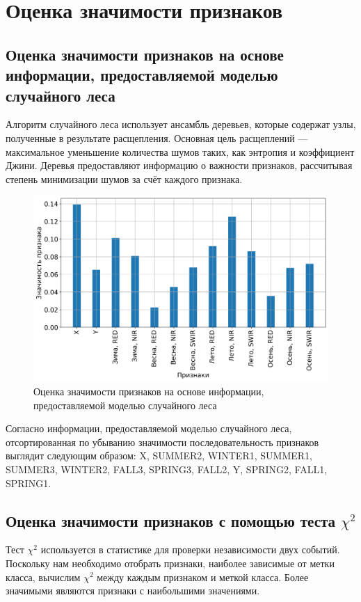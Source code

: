 \documentclass[14pt, a4paper, oneside]{extarticle}
\begin{document}
\section{Оценка значимости признаков}
\subsection{Оценка значимости признаков на основе информации, предоставляемой моделью случайного леса}
Алгоритм случайного леса использует ансамбль деревьев, которые содержат узлы, полученные в результате расщепления. Основная цель расщеплений --- максимальное уменьшение количества шумов таких, как энтропия и коэффициент Джини. Деревья предоставляют информацию о важности признаков, рассчитывая степень минимизации шумов за счёт каждого признака.

\begin{figure}[H]
    \caption{Оценка значимости признаков на основе информации, предоставляемой моделью случайного леса}
    \centering
    \includegraphics[scale=0.6]{rf-feature-importances}
\end{figure}

Согласно информации, предоставляемой моделью случайного леса, отсортированная по убыванию значимости последовательность признаков выглядит следующим образом: X, SUMMER2, WINTER1, SUMMER1, SUMMER3, WINTER2, FALL3, SPRING3, FALL2, Y, SPRING2, FALL1, SPRING1.

\subsection{Оценка значимости признаков с помощью теста $\chi^2$}
Тест $\chi^2$ используется в статистике для проверки независимости двух событий. Поскольку нам необходимо отобрать признаки, наиболее зависимые от метки класса, вычислим $\chi^2$ между каждым признаком и меткой класса. Более значимыми являются признаки с наибольшими значениями.
\end{document}
